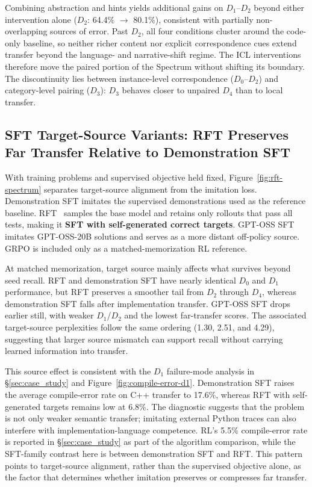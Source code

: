 \documentclass[]{bytedance_seed}
\theoremstyle{plain}
\theoremstyle{definition}
\theoremstyle{remark}
\begin{document}
Combining abstraction and hints yields additional gains on $D_1$--$D_2$ beyond either intervention alone ($D_2$: 64.4\% $\to$ 80.1\%), consistent with partially non-overlapping sources of error. Past $D_2$, all four conditions cluster around the code-only baseline, so neither richer content nor explicit correspondence cues extend transfer beyond the language- and narrative-shift regime. The ICL interventions therefore move the paired portion of the Spectrum without shifting its boundary. The discontinuity lies between instance-level correspondence ($D_0$--$D_2$) and category-level pairing ($D_3$): $D_3$ behaves closer to unpaired $D_4$ than to local transfer.



\subsection{SFT Target-Source Variants: RFT Preserves Far Transfer Relative to Demonstration SFT}
\label{subsec:sft-target-source}

With training problems and supervised objective held fixed, Figure~\ref{fig:rft-spectrum} separates target-source alignment from the imitation loss. Demonstration SFT imitates the supervised demonstrations used as the reference baseline. RFT~\citep{yuan2023rft} samples the base model and retains only rollouts that pass all tests, making it \textbf{SFT with self-generated correct targets}. GPT-OSS SFT imitates GPT-OSS-20B solutions and serves as a more distant off-policy source. GRPO is included only as a matched-memorization RL reference.

At matched memorization, target source mainly affects what survives beyond seed recall. RFT and demonstration SFT have nearly identical $D_0$ and $D_1$ performance, but RFT preserves a smoother tail from $D_2$ through $D_4$, whereas demonstration SFT falls after implementation transfer. GPT-OSS SFT drops earlier still, with weaker $D_1$/$D_2$ and the lowest far-transfer scores. The associated target-source perplexities follow the same ordering (1.30, 2.51, and 4.29), suggesting that larger source mismatch can support recall without carrying learned information into transfer.

This source effect is consistent with the $D_1$ failure-mode analysis in \S\ref{sec:case_study} and Figure~\ref{fig:compile-error-d1}. Demonstration SFT raises the average compile-error rate on C++ transfer to 17.6\%, whereas RFT with self-generated targets remains low at 6.8\%. The diagnostic suggests that the problem is not only weaker semantic transfer; imitating external Python traces can also interfere with implementation-language competence. RL's 5.5\% compile-error rate is reported in \S\ref{sec:case_study} as part of the algorithm comparison, while the SFT-family contrast here is between demonstration SFT and RFT.
This pattern points to target-source alignment, rather than the supervised objective alone, as the factor that determines whether imitation preserves or compresses far transfer.
\end{document}
